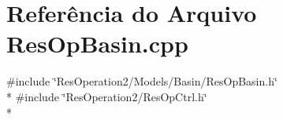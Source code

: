 \section{Referência do Arquivo Res\+Op\+Basin.\+cpp}
\label{_res_op_basin_8cpp}
{\ttfamily \#include \char`\"{}Res\+Operation2/\+Models/\+Basin/\+Res\+Op\+Basin.\+h\char`\"{}}\\*
{\ttfamily \#include \char`\"{}Res\+Operation2/\+Res\+Op\+Ctrl.\+h\char`\"{}}\\*
